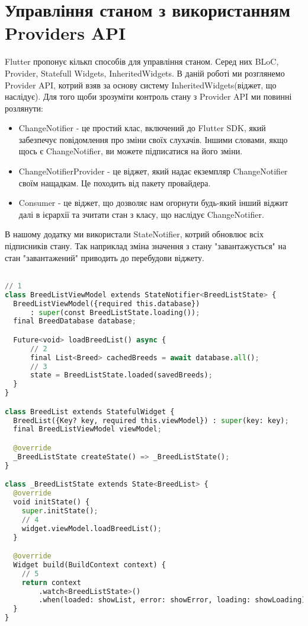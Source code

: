 \section{Управління станом з використанням Providers API}
\label{section.3.5}
Flutter пропонує кількп способів для управління станом. Серед них BLoC, Provider, Statefull Widgets, InheritedWidgets.
В даній роботі ми розглянемо Provider API, котрий взяв за основу систему InheritedWidgets(віджет, що наслідує).
Для того щоби зрозуміти контроль стану з Provider API ми повинні розлянути:

\begin{itemize}
    \item ChangeNotifier - це простий клас, включений до Flutter SDK, який забезпечує повідомлення про зміни своїх слухачів. Іншими словами, якщо щось є ChangeNotifier, ви можете підписатися на його зміни.
    \item ChangeNotifierProvider - це віджет, який надає екземпляр ChangeNotifier своїм нащадкам. Це походить від пакету провайдера.
    \item Consumer - це віджет, що дозволяє нам огорнути будь-який інший віджит далі в ієрархії та зчитати стан з класу, що наслідує ChangeNotifier.
\end{itemize}

В нашому додатку ми використали StateNotifier, котрий обновлює всіх підписників стану.
Так наприклад зміна значення з стану "завантажується" на стан "завантажений" приводить до перебудови віджету.

\begin{lstlisting}[style=light, language=Python,label={lst:flutter_sqflite},caption=Flutter SQFLITE]

// 1
class BreedListViewModel extends StateNotifier<BreedListState> {
  BreedListViewModel({required this.database})
      : super(const BreedListState.loading());
  final BreedDatabase database;

  Future<void> loadBreedList() async {
      // 2
      final List<Breed> cachedBreeds = await database.all();
      // 3
      state = BreedListState.loaded(savedBreeds);
  }
}

class BreedList extends StatefulWidget {
  BreedList({Key? key, required this.viewModel}) : super(key: key);
  final BreedListViewModel viewModel;

  @override
  _BreedListState createState() => _BreedListState();
}

class _BreedListState extends State<BreedList> {
  @override
  void initState() {
    super.initState();
    // 4
    widget.viewModel.loadBreedList();
  }

  @override
  Widget build(BuildContext context) {
    // 5
    return context
        .watch<BreedListState>()
        .when(loaded: showList, error: showError, loading: showLoading);
  }
}
\end{lstlisting}

